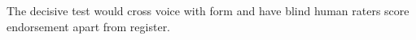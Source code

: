 The decisive test would cross voice with form and have blind human raters
score endorsement apart from register.
